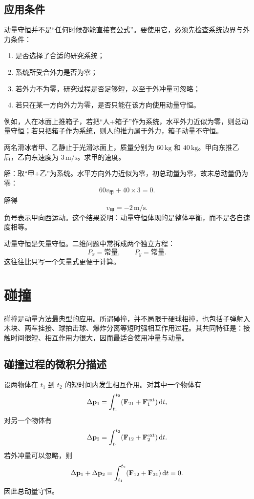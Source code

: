 \subsection{应用条件}

动量守恒并不是“任何时候都能直接套公式”。要使用它，必须先检查系统边界与外力条件：
\begin{enumerate}
  \item 是否选择了合适的研究系统；
  \item 系统所受合外力是否为零；
  \item 若外力不为零，研究过程是否足够短，以至于外冲量可忽略；
  \item 若只在某一方向外力为零，是否只能在该方向使用动量守恒。
\end{enumerate}

例如，人在冰面上推箱子，若把“人+箱子”作为系统，水平外力近似为零，则总动量守恒；若只把箱子作为系统，则人的推力属于外力，箱子动量不守恒。

\begin{example}
两名滑冰者甲、乙静止于光滑冰面上，质量分别为 $60\,\mathrm{kg}$ 和 $40\,\mathrm{kg}$。甲向东推乙后，乙向东速度为 $3\,\mathrm{m/s}$。求甲的速度。

解：取“甲+乙”为系统。水平方向外力近似为零，初总动量为零，故末总动量仍为零：
\[
60v_\text{甲}+40\times 3=0.
\]
解得
\[
v_\text{甲}=-2\,\mathrm{m/s}.
\]
负号表示甲向西运动。这个结果说明：动量守恒体现的是整体平衡，而不是各自速度相等。
\end{example}

\begin{remark}
动量守恒是矢量守恒。二维问题中常拆成两个独立方程：
\[
P_x=\text{常量},\qquad P_y=\text{常量}.
\]
这往往比只写一个矢量式更便于计算。
\end{remark}

\section{碰撞}

碰撞是动量方法最典型的应用。所谓碰撞，并不局限于硬球相撞，也包括子弹射入木块、两车挂接、球拍击球、爆炸分离等短时强相互作用过程。其共同特征是：接触时间很短、相互作用力很大，因而最适合使用冲量与动量。

\subsection{碰撞过程的微积分描述}

设两物体在 $t_1$ 到 $t_2$ 的短时间内发生相互作用。对其中一个物体有
\[
\Delta \vb p_1=\int_{t_1}^{t_2}(\vb F_{21}+\vb F_1^{\text{ext}})\,\dd t,
\]
对另一个物体有
\[
\Delta \vb p_2=\int_{t_1}^{t_2}(\vb F_{12}+\vb F_2^{\text{ext}})\,\dd t.
\]
若外冲量可以忽略，则
\[
\Delta \vb p_1+\Delta \vb p_2
=\int_{t_1}^{t_2}(\vb F_{12}+\vb F_{21})\,\dd t=0.
\]
因此总动量守恒。

